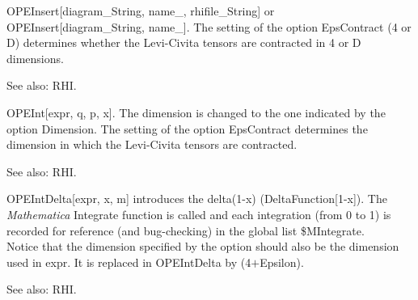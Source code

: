 


OPEInsert[diagram\_{}String, name\_{}, rhifile\_{}String] or OPEInsert[diagram\_{}String, name\_{}]. The setting of the option
  EpsContract (4 or D) determines whether the Levi-Civita tensors are contracted in 4 or D dimensions.

See also:  RHI.





OPEInt[expr, q, p, x]. { }The dimension is changed to the one indicated by the option { }Dimension. The setting of the option EpsContract
  determines { }the dimension in which the Levi-Civita tensors are contracted.

See also:  RHI.





OPEIntDelta[expr, x, m] introduces the delta(1-x) (DeltaFunction[1-x]). The {\itshape Mathematica} Integrate function is called and each integration
{ }(from 0 to 1) is recorded for reference (and bug-checking) in the global list
  \${}MIntegrate. \\
Notice that the dimension specified by the option should also be the dimension used in expr. It is replaced in OPEIntDelta by
  (4\(+\)Epsilon).

See also:  RHI.



